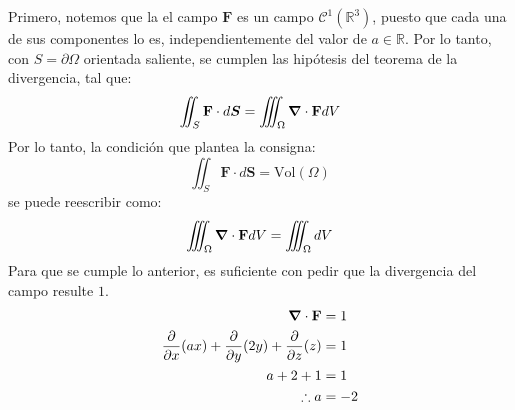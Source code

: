 \begin{solution}
    Primero, notemos que la el campo $\mathbf{F}$ es un campo $\mathcal{C}^1(\mathbb{R}^3)$, puesto que
    cada una de sus componentes lo es, independientemente del valor de $a \in \mathbb{R}$.
    Por lo tanto, con $S = \partial \Omega$ orientada saliente, se cumplen las hipótesis del
    teorema de la divergencia, tal que:
    \begin{equation*}
        \iint_S \mathbf{F} \cdot d\boldsymbol{S} = \iiint_\Omega \grad \cdot \mathbf{F} dV
    \end{equation*}
    Por lo tanto, la condición que plantea la consigna:
    \begin{equation*}
        \iint_S \mathbf{F} \cdot d\boldsymbol{S} = \text{Vol}(\Omega)
    \end{equation*}
    se puede reescribir como:
    \begin{equation*}
        \iiint_\Omega \grad \cdot \mathbf{F} dV = \iiint_\Omega dV
    \end{equation*}
    Para que se cumple lo anterior, es suficiente con pedir que la divergencia del campo resulte $1$.
    \begin{align*}
        \grad \cdot \mathbf{F} &= 1 \\
        \frac{\partial}{\partial x}(ax) + \frac{\partial}{\partial y}(2y) + \frac{\partial}{\partial z}(z) &= 1 \\
        a + 2 + 1 &= 1 \\
        \therefore a &= -2
    \end{align*}
\end{solution}